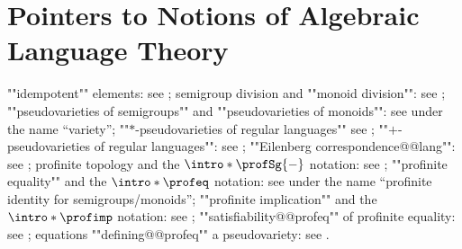 \section{Pointers to Notions of Algebraic Language Theory}
\label{apdx:pointers-pin}

\begin{itemize}
	\itemAP ""idempotent"" elements:
		see \cite[\S II.1.2, p.~14]{Pin2022MathematicalFoundations};
	\itemAP semigroup division and ""monoid division"":
		see \cite[\S II.3.3, p.~21]{Pin2022MathematicalFoundations};
	\itemAP ""pseudovarieties of semigroups"" and ""pseudovarieties of monoids"":
		see \cite[\S XI.1, p.~189]{Pin2022MathematicalFoundations} under the name ``variety'';
	\itemAP ""$\ast $-pseudovarieties of regular languages""
		see \cite[\S XIII.3, p.~226]{Pin2022MathematicalFoundations};
	\itemAP ""$+$-pseudovarieties of regular languages"":
		see \cite[\S XIII.4, ``Eilenberg’s $+$-varieties'', p.~229]{Pin2022MathematicalFoundations};
	\itemAP ""Eilenberg correspondence@@lang"":
		see \cite[Theorem XIII.4.10, p.~228]{Pin2022MathematicalFoundations};
	\itemAP profinite topology and the $\intro*\profSg{-}$ notation:
		see \cite[\S X.2, p.~178]{Pin2022MathematicalFoundations};
	\itemAP ""profinite equality"" and the $\intro*\profeq$ notation:
		see \cite[\S XI.3, p.~193]{Pin2022MathematicalFoundations} under
		the name ``profinite identity for semigroups/monoids'';
	\itemAP ""profinite implication"" and the $\intro*\profimp$ notation:
		see \cite[\S XIII.1, p.~223]{Pin2022MathematicalFoundations};
	\itemAP ""satisfiability@@profeq"" of profinite equality:
		see \cite[\S XI.3, p.~193]{Pin2022MathematicalFoundations};
	\itemAP equations ""defining@@profeq"" a pseudovariety:
		see \cite[\S XI.3.3, p.~194]{Pin2022MathematicalFoundations}.
\end{itemize}